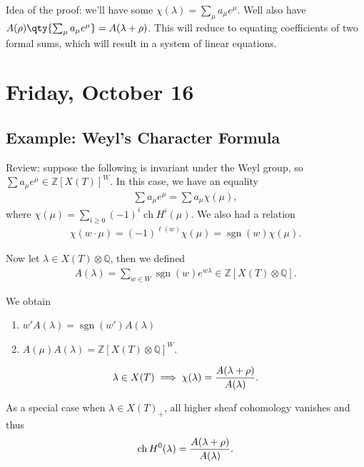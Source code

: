 Idea of the proof: we'll have some
\(\chi(\lambda) = \sum_\mu a_\mu e^\mu\). Well also have
\(A(\rho) \qty{ \sum_\mu a_\mu e^\mu } = A(\lambda + \rho)\). This will
reduce to equating coefficients of two formal sums, which will result in
a system of linear equations.

\hypertarget{friday-october-16}{%
\section{Friday, October 16}\label{friday-october-16}}

\hypertarget{example-weyls-character-formula}{%
\subsection{Example: Weyl's Character
Formula}\label{example-weyls-character-formula}}

Review: suppose the following is invariant under the Weyl group, so
\(\sum a_\mu e^\mu \in {\mathbb{Z}}[X(T)]^W\). In this case, we have an
equality
\begin{align*}  
\sum a_\mu e^\mu = \sum a_\mu \chi(\mu)
,\end{align*}
where \(\chi(\mu) = \sum_{i\geq 0} (-1)^i \operatorname{ch}H^i(\mu)\).
We also had a relation
\begin{align*}  
\chi(w\cdot \mu) = (-1)^{\ell(w)} \chi(\mu) = \operatorname{sgn}(w) \chi(\mu)
.\end{align*}

Now let \(\lambda \in X(T) \otimes{\mathbb{Q}}\), then we defined
\begin{align*}  
A(\lambda) = \sum_{w\in W} \operatorname{sgn}(w) e^{w\lambda} \in {\mathbb{Z}}[X(T) \otimes{\mathbb{Q}}]
.\end{align*}

We obtain

\begin{enumerate}
\def\labelenumi{\arabic{enumi}.}
\item
  \(w' A(\lambda) = \operatorname{sgn}(w') A(\lambda)\)
\item
  \(A(\mu) A(\lambda) = {\mathbb{Z}}[X(T) \otimes{\mathbb{Q}}]^W\).
\end{enumerate}

\begin{theorem}

\begin{align*}  
\lambda\in X(T) \implies \chi(\lambda) = {A(\lambda + \rho) \over A(\lambda)}
.\end{align*}

As a special case when \(\lambda \in X(T)_+\), all higher sheaf
cohomology vanishes and thus
\begin{align*}  
\operatorname{ch}H^0(\lambda) = {A(\lambda + \rho) \over A(\lambda)}
.\end{align*}

\end{theorem}

